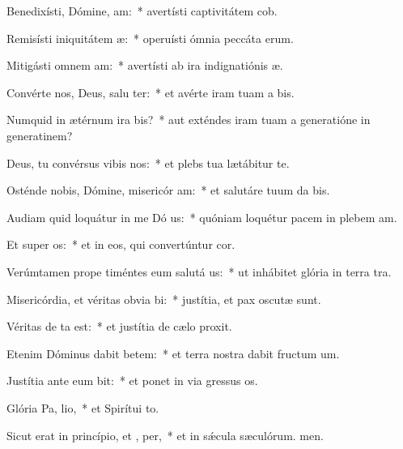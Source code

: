 \item Benedixísti, Dómine,  am:~* avertísti captivitátem cob.
\item Remisísti iniquitátem  æ:~* operuísti ómnia peccáta erum.
\item Mitigásti omnem  am:~* avertísti ab ira indignatiónis æ.
\item Convérte nos, Deus, salu ter:~* et avérte iram tuam a bis.
\item Numquid in ætérnum ira bis?~* aut exténdes iram tuam a generatióne in generatinem?
\item Deus, tu convérsus vibis nos:~* et plebs tua lætábitur  te.
\item Osténde nobis, Dómine, misericór am:~* et salutáre tuum da bis.
\item Audiam quid loquátur in me Dó us:~* quóniam loquétur pacem in plebem am.
\item Et super  os:~* et in eos, qui convertúntur  cor.
\item Verúmtamen prope timéntes eum salutá us:~* ut inhábitet glória in terra tra.
\item Misericórdia, et véritas obvia bi:~* justítia, et pax oscutæ sunt.
\item Véritas de  ta est:~* et justítia de cælo proxit.
\item Etenim Dóminus dabit betem:~* et terra nostra dabit fructum um.
\item Justítia ante eum bit:~* et ponet in via gressus os.
\item Glória Pa,  lio,~* et Spirítui to.
\item Sicut erat in princípio, et ,  per,~* et in sǽcula sæculórum. men.
